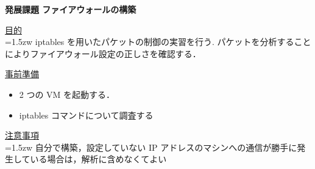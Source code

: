 

% 


% 

\begin{center}

{\LARGE \bfseries 発展課題 ファイアウォールの構築\par}

\end{center}

\vspace{1cm}

{\LARGE \uline{目的}} \\

\hangindent=1.5zw
\noindent
iptables を用いたパケットの制御の実習を行う. パケットを分析することによりファイアウォール設定の正しさを確認する．


\vspace{1cm}

{\LARGE \uline{事前準備}} 

\begin{itemize}
    \item 2 つの VM を起動する．
    \item iptables コマンドについて調査する
\end{itemize}

\vspace{1cm}

{\LARGE \uline{注意事項}} \\

\hangindent=1.5zw
\noindent
自分で構築，設定していない IP アドレスのマシンへの通信が勝手に発生している場合は，解析に含めなくてよい

\vspace{1cm}

